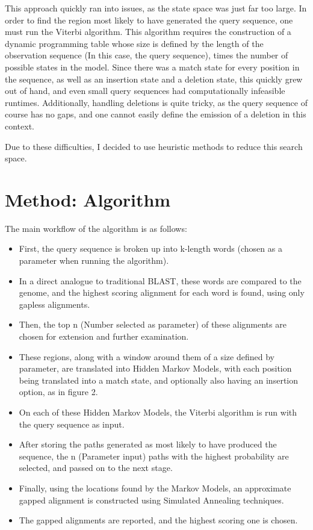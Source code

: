 \documentclass[12pt, conference]{IEEEtran}
\begin{document}
	
	This approach quickly ran into issues, as the state space was just far too large. In order to find the region most likely to have generated the query sequence, one must run the Viterbi algorithm. This algorithm requires the construction of a dynamic programming table whose size is defined by the length of the observation sequence (In this case, the query sequence), times the number of possible states in the model. Since there was a match state for every position in the sequence, as well as an insertion state and a deletion state, this quickly grew out of hand, and even small query sequences had computationally infeasible runtimes. Additionally, handling deletions is quite tricky, as the query sequence of course has no gaps, and one cannot easily define the emission of a deletion in this context.
	
	Due to these difficulties, I decided to use heuristic methods to reduce this search space.

\section{\textbf{Method: Algorithm}}

The main workflow of the algorithm is as follows: 

	\begin{itemize}
		\item First, the query sequence is broken up into k-length words (chosen as a parameter when running the algorithm).
		\item In a direct analogue to traditional BLAST, these words are compared to the genome, and the highest scoring alignment for each word is found, using only gapless alignments.
		\item Then, the top n (Number selected as parameter) of these alignments are chosen for extension and further examination.
		\item These regions, along with a window around them of a size defined by parameter, are translated into Hidden Markov Models, with each position being translated into a match state, and optionally also having an insertion option, as in figure 2.
		\item On each of these Hidden Markov Models, the Viterbi algorithm is run with the query sequence as input.
		\item After storing the paths generated as most likely to have produced the sequence, the n (Parameter input) paths with the highest probability are selected, and passed on to the next stage.
		\item Finally, using the locations found by the Markov Models, an approximate gapped alignment is constructed using Simulated Annealing techniques.
		\item The gapped alignments are reported, and the highest scoring one is chosen.
	\end{itemize}
	
\end{document}
